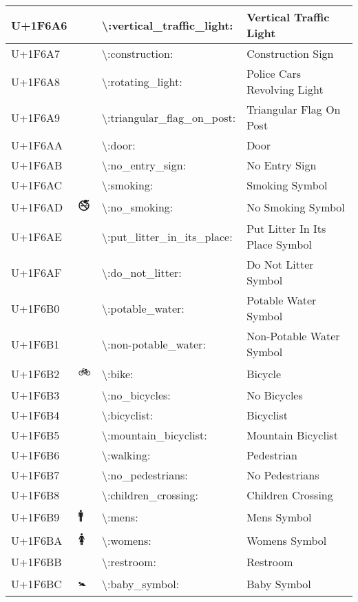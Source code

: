 \begin{table}[h]
\begin{tabulary}{\linewidth}{|L|L|L|L|}
\hline
U+1F6A6 & 🚦 & {\textbackslash}:vertical\_traffic\_light: & Vertical Traffic Light \\
\hline
U+1F6A7 & 🚧 & {\textbackslash}:construction: & Construction Sign \\
\hline
U+1F6A8 & 🚨 & {\textbackslash}:rotating\_light: & Police Cars Revolving Light \\
\hline
U+1F6A9 & 🚩 & {\textbackslash}:triangular\_flag\_on\_post: & Triangular Flag On Post \\
\hline
U+1F6AA & 🚪 & {\textbackslash}:door: & Door \\
\hline
U+1F6AB & 🚫 & {\textbackslash}:no\_entry\_sign: & No Entry Sign \\
\hline
U+1F6AC & 🚬 & {\textbackslash}:smoking: & Smoking Symbol \\
\hline
U+1F6AD & 🚭 & {\textbackslash}:no\_smoking: & No Smoking Symbol \\
\hline
U+1F6AE & 🚮 & {\textbackslash}:put\_litter\_in\_its\_place: & Put Litter In Its Place Symbol \\
\hline
U+1F6AF & 🚯 & {\textbackslash}:do\_not\_litter: & Do Not Litter Symbol \\
\hline
U+1F6B0 & 🚰 & {\textbackslash}:potable\_water: & Potable Water Symbol \\
\hline
U+1F6B1 & 🚱 & {\textbackslash}:non-potable\_water: & Non-Potable Water Symbol \\
\hline
U+1F6B2 & 🚲 & {\textbackslash}:bike: & Bicycle \\
\hline
U+1F6B3 & 🚳 & {\textbackslash}:no\_bicycles: & No Bicycles \\
\hline
U+1F6B4 & 🚴 & {\textbackslash}:bicyclist: & Bicyclist \\
\hline
U+1F6B5 & 🚵 & {\textbackslash}:mountain\_bicyclist: & Mountain Bicyclist \\
\hline
U+1F6B6 & 🚶 & {\textbackslash}:walking: & Pedestrian \\
\hline
U+1F6B7 & 🚷 & {\textbackslash}:no\_pedestrians: & No Pedestrians \\
\hline
U+1F6B8 & 🚸 & {\textbackslash}:children\_crossing: & Children Crossing \\
\hline
U+1F6B9 & 🚹 & {\textbackslash}:mens: & Mens Symbol \\
\hline
U+1F6BA & 🚺 & {\textbackslash}:womens: & Womens Symbol \\
\hline
U+1F6BB & 🚻 & {\textbackslash}:restroom: & Restroom \\
\hline
U+1F6BC & 🚼 & {\textbackslash}:baby\_symbol: & Baby Symbol \\

\end{tabulary}
\end{table}
